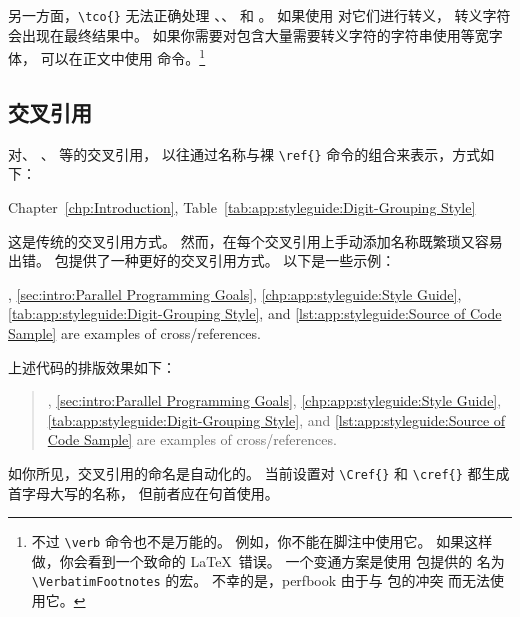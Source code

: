 另一方面，\verb|\tco{}| 无法正确处理
\qco{\%}、\qco{\{}、\qco{\}} 和 \qco{\\}。
如果使用 \qco{\\} 对它们进行转义，
转义字符会出现在最终结果中。
如果你需要对包含大量需要转义字符的字符串使用等宽字体，
可以在正文中使用 \qco{\\verb} 命令。\footnote{
  不过 \texttt{\textbackslash verb} 命令也不是万能的。
  例如，你不能在脚注中使用它。
  如果这样做，你会看到一个致命的 \LaTeX\ 错误。
  一个变通方案是使用  包提供的
  名为 \texttt{\textbackslash VerbatimFootnotes} 的宏。
  不幸的是，perfbook 由于与  包的冲突
  而无法使用它。
  }

\subsection{交叉引用}
\label{sec:app:styleguide:Cross-Reference}

对、
、
等的交叉引用，
以往通过名称与裸 \verb|\ref{}|
命令的组合来表示，方式如下：

\begin{VerbatimN}
Chapter~\ref{chp:Introduction},
Table~\ref{tab:app:styleguide:Digit-Grouping Style}
\end{VerbatimN}

这是传统的交叉引用方式。
然而，在每个交叉引用上手动添加名称既繁琐又容易出错。
 包提供了一种更好的交叉引用方式。
以下是一些示例：

\begin{VerbatimN}
,
\cref{sec:intro:Parallel Programming Goals},
\cref{chp:app:styleguide:Style Guide},
\cref{tab:app:styleguide:Digit-Grouping Style}, and
\cref{lst:app:styleguide:Source of Code Sample} are
examples of cross\-/references.
\end{VerbatimN}

上述代码的排版效果如下：

\begin{quote}
,
\cref{sec:intro:Parallel Programming Goals},
\cref{chp:app:styleguide:Style Guide},
\cref{tab:app:styleguide:Digit-Grouping Style}, and
\cref{lst:app:styleguide:Source of Code Sample} are
examples of cross\-/references.
\end{quote}

如你所见，交叉引用的命名是自动化的。
当前设置对 \verb|\Cref{}| 和 \verb|\cref{}| 都生成首字母大写的名称，
但前者应在句首使用。

